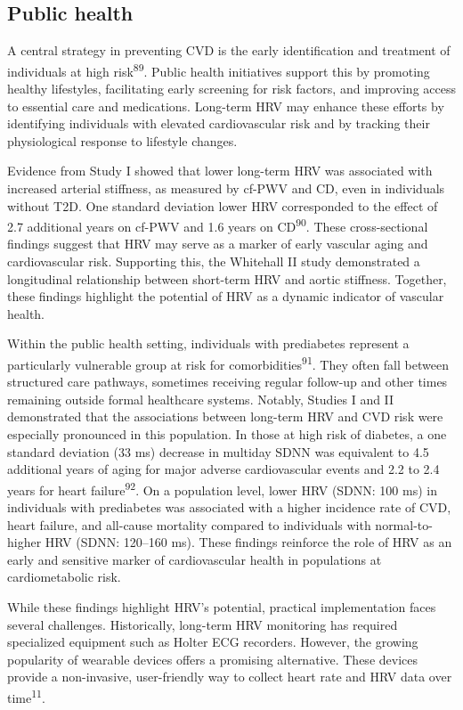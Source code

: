 \documentclass[
  a4paper,
  headsepline=true,
  open=any]{scrbook}
\begin{document}
\hypertarget{public-health}{%
\subsection{Public health}\label{public-health}}

A central strategy in preventing CVD is the early identification and
treatment of individuals at high risk\textsuperscript{89}. Public health
initiatives support this by promoting healthy lifestyles, facilitating
early screening for risk factors, and improving access to essential care
and medications. Long-term HRV may enhance these efforts by identifying
individuals with elevated cardiovascular risk and by tracking their
physiological response to lifestyle changes.

Evidence from Study I showed that lower long-term HRV was associated
with increased arterial stiffness, as measured by cf-PWV and CD, even in
individuals without T2D. One standard deviation lower HRV corresponded
to the effect of 2.7 additional years on cf-PWV and 1.6 years on
CD\textsuperscript{90}. These cross-sectional findings suggest that HRV
may serve as a marker of early vascular aging and cardiovascular risk.
Supporting this, the Whitehall II study demonstrated a longitudinal
relationship between short-term HRV and aortic stiffness. Together,
these findings highlight the potential of HRV as a dynamic indicator of
vascular health.

Within the public health setting, individuals with prediabetes represent
a particularly vulnerable group at risk for
comorbidities\textsuperscript{91}. They often fall between structured
care pathways, sometimes receiving regular follow-up and other times
remaining outside formal healthcare systems. Notably, Studies I and II
demonstrated that the associations between long-term HRV and CVD risk
were especially pronounced in this population. In those at high risk of
diabetes, a one standard deviation (33 ms) decrease in multiday SDNN was
equivalent to 4.5 additional years of aging for major adverse
cardiovascular events and 2.2 to 2.4 years for heart
failure\textsuperscript{92}. On a population level, lower HRV (SDNN: 100
ms) in individuals with prediabetes was associated with a higher
incidence rate of CVD, heart failure, and all-cause mortality compared
to individuals with normal-to-higher HRV (SDNN: 120--160 ms). These
findings reinforce the role of HRV as an early and sensitive marker of
cardiovascular health in populations at cardiometabolic risk.

While these findings highlight HRV's potential, practical implementation
faces several challenges. Historically, long-term HRV monitoring has
required specialized equipment such as Holter ECG recorders. However,
the growing popularity of wearable devices offers a promising
alternative. These devices provide a non-invasive, user-friendly way to
collect heart rate and HRV data over time\textsuperscript{11}.
\end{document}
